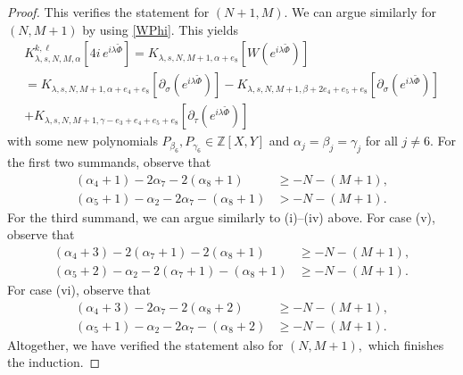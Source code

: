 \documentclass[leqno]{amsart}
\theoremstyle{definition}
\theoremstyle{remark}
\numberwithin{equation}{section}
\newcommand{\Z}{\mathbb{Z}}
\begin{document}
\begin{proof}
This verifies the statement for $(N + 1,M)$. We can argue similarly for $(N,M + 1)$ by using \eqref{WPhi}. 
This yields
\begin{multline*}
 K_{\lambda,s,N,M,\alpha}^{k,\ell}[4i\,e^{i\lambda \tilde \Phi}]
 = K_{\lambda,s,N,M + 1,\alpha + e_8}[W(e^{i\lambda \tilde \Phi})] \\
 = K_{\lambda,s,N,M + 1,\alpha + e_ 4 + e_8}[\partial_\sigma(e^{i\lambda \tilde \Phi})]
-K_{\lambda,s,N,M + 1,\beta + 2e_ 4 + e_5 + e_8}[\partial_\sigma(e^{i\lambda \tilde \Phi})] \\
+ K_{\lambda,s,N,M + 1,\gamma - e_3 + e_ 4 + e_5 + e_8}[\partial_\tau(e^{i\lambda \tilde \Phi})]
\end{multline*}
with some new polynomials $P_{\beta_6},P_{\gamma_6}\in \Z[X,Y]$ and $\alpha_j = \beta_j = \gamma_j$ for all $j\neq 6$. For the first two summands, observe that
\begin{align*}
(\alpha_ 4 + 1)-2\alpha_7-2(\alpha_8 + 1) &\ge -N-(M + 1),\\
(\alpha_5 + 1)-\alpha_2-2\alpha_7-(\alpha_8 + 1) & > -N-(M + 1).
\end{align*}
For the third summand, we can argue similarly to (i)--(iv) above. For case (v), observe that
\begin{align*}
(\alpha_ 4 + 3)-2(\alpha_7 + 1)-2(\alpha_8 + 1) &\ge -N-(M + 1), \\
(\alpha_5 + 2)-\alpha_2-2(\alpha_7 + 1)-(\alpha_8 + 1) &\ge -N-(M + 1).
\end{align*}
For case (vi), observe that
\begin{align*}
(\alpha_ 4 + 3)-2\alpha_7-2(\alpha_8 + 2) &\ge -N-(M + 1), \\
(\alpha_5 + 1)-\alpha_2-2\alpha_7-(\alpha_8 + 2) &\ge -N-(M + 1).
\end{align*}
Altogether, we have verified the statement also for $(N,M+1),$ which  finishes the induction.
\end{proof}
\end{document}
